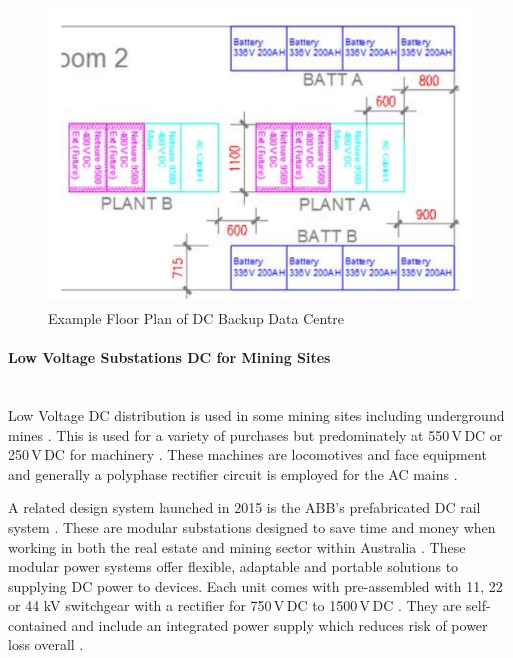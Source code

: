 \begin{figure}[H]
\hfill\includegraphics[width = 130mm, height = 80mm]{images/DC_Centre}\hspace*{\fill}
\caption{Example Floor Plan of DC Backup Data Centre \cite{Lisy2015}}
\label{fig:DC_Centre}
\end{figure} 

\newpage

\paragraph{Low Voltage Substations DC for Mining Sites}
~\\
Low Voltage DC distribution is used in some mining sites including underground mines \cite{Morley1990}. This is used for a variety of purchases but predominately at 550\,V\,DC or 250\,V\,DC for machinery \cite{Morley1990}. These machines are locomotives and face equipment and generally a polyphase rectifier circuit is employed for the AC mains \cite{Morley1990}.
\newline

A related design system launched in 2015 is the ABB's prefabricated DC rail system \cite{website:ProQuest1}. These are modular substations designed to save time and money when working in both the real estate and mining sector within Australia \cite{website:ProQuest1}. These modular power systems offer flexible, adaptable and portable solutions to supplying DC power to devices. Each unit comes with pre-assembled with 11, 22 or 44 kV switchgear with a rectifier for 750\,V\,DC to 1500\,V\,DC \cite{website:ProQuest1}. They are self-contained and include an integrated power supply which reduces risk of power loss overall \cite{website:ProQuest1}.            

